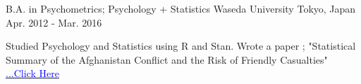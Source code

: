 

\begin{cventries}

  \cventry
    {B.A. in Psychometrics; Psychology + Statistics} %
    {Waseda University} %
    {Tokyo, Japan} %
    {Apr. 2012 - Mar. 2016} %
    {
      \begin{cvitems} %
        \item {Studied Psychology and Statistics using R and Stan. Wrote a paper ; "Statistical Summary of the Afghanistan Conflict and the Risk of Friendly Casualties" \href{https://github.com/s-87date/afghan_war_diary}{\textcolor{blue}{...Click Here}}}
      \end{cvitems}
    }

\end{cventries}
